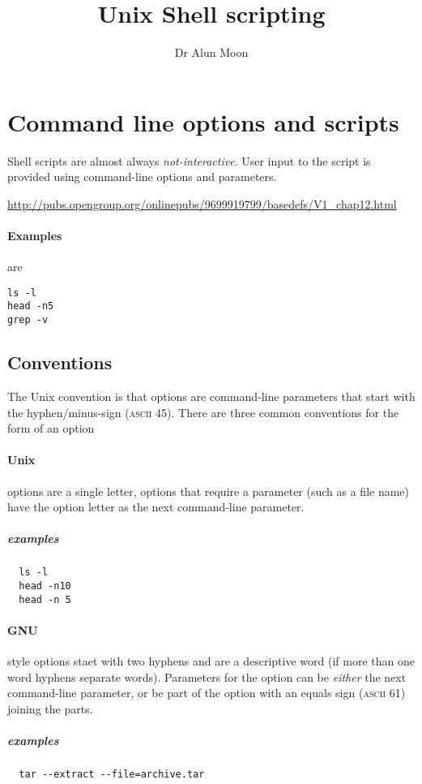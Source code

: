 \documentclass[12pt,a4paper]{article}
\title{Unix Shell scripting}
\author{Dr Alun Moon}
\begin{document}
\maketitle

\section{Command line options and scripts}
Shell scripts are almost always \emph{not-interactive}.
User input to the script is provided using command-line options and parameters.

\noindent\url{http://pubs.opengroup.org/onlinepubs/9699919799/basedefs/V1_chap12.html}

\paragraph{Examples} are
\begin{verbatim}
ls -l
head -n5
grep -v
\end{verbatim}

\subsection{Conventions}
The Unix convention is that options are command-line parameters that start with the hyphen/minus-sign (\textsc{ascii} 45).  There are three common conventions for the form of an option

\paragraph{Unix} options are a single letter, options that require a parameter (such as a file name) have the option letter as the next command-line parameter.
\subparagraph{examples}
\begin{verbatim}
  ls -l
  head -n10
  head -n 5
\end{verbatim}

\paragraph{GNU} style options staet with two hyphens and are a descriptive word (if more than one word hyphens separate words).  Parameters for the option can be \emph{either} the next command-line parameter, or be part of the option with an equals sign (\textsc{ascii} 61) joining the parts.
\subparagraph{examples}
\begin{verbatim}
  tar --extract --file=archive.tar
\end{verbatim}
\end{document}
